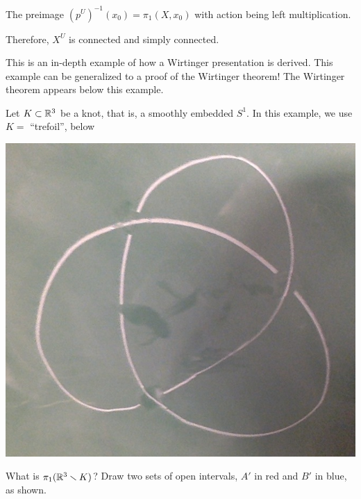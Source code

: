 \documentclass[11pt,leqno,oneside]{amsart}
\newenvironment{dateenv}{
  \vspace{1em}
}{
  \vspace{1em}
}
\newcommand{\mydate}[4]{
  \newdate{#1}{#2}{#3}{#4}
  \begin{dateenv}
    \hfill\displaydate{#1}
  \end{dateenv}
}
\numberwithin{thm}{section}
\newcommand{\minus}{\smallsetminus}
\newcommand{\fund}[1][1]{\pi_{#1}}
\begin{document}
The preimage $(p^U)^{-1}(x_0) = \fund(X, x_0)$ with action being left multiplication.

Therefore, $X^U$ is connected and simply connected.

\mydate{d6}{3}{2}{2017}

\begin{example}
  This is an in-depth example of how a Wirtinger presentation is derived.  This example can be generalized to a proof of the Wirtinger theorem!  The Wirtinger theorem appears below this example.

  Let $K \subset {\mathbb R}^3$ be a knot, that is, a smoothly embedded $S^1$.  In this example, we use $K =$ ``trefoil'', below

  \includegraphics[scale=0.15]{images/trefoil.jpg}

  What is $\fund(\R^3\minus K)$?  Draw two sets of open intervals, $A'$ in red and $B'$ in blue, as shown.


\end{example}
\end{document}
